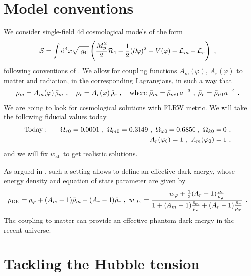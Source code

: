 \documentclass[11pt,a4paper,english,twoside]{article}
\newcommand{\nn}{\nonumber}
\def\beq{\begin{equation}}
\def\eeq{\end{equation}}
\def\bea{\begin{eqnarray}}
\def\eea{\end{eqnarray}}
\def\del {\partial}
\def\d {{\rm d}}
\begin{document}




\section{Model conventions}

We consider single-field 4d cosmological models of the form
\beq
{\cal S} = \int \d^4 x \sqrt{|g_4|} \left( \frac{M_p^2}{2} {\cal R}_4 - \frac12 (\del \varphi)^2 - V(\varphi) - {\cal L}_m - {\cal L}_r \right) \ ,
\eeq
following conventions of \cite[Sec. 3.2]{Andriot:2026lac}. We allow for coupling functions $A_m(\varphi),\, A_r(\varphi)$ to matter and radiation, in the corresponding Lagrangians, in such a way that
\beq
\rho_m = A_m(\varphi) \, \bar{\rho}_m \ ,\quad \rho_r = A_r(\varphi) \, \bar{\rho}_r \ , \quad {\rm where} \ \bar{\rho}_m = \bar{\rho}_{m0} \, a^{-3} \ ,\ \bar{\rho}_r = \bar{\rho}_{r0} \, a^{-4}\ . 
\eeq
We are going to look for cosmological solutions with FLRW metric. We will take the following fiducial values today
\bea
{\rm Today}:&& \quad \Omega_{r0} = 0.0001 \ ,\ \Omega_{m0}= 0.3149 \ ,\ \Omega_{\varphi0}=0.6850 \ ,\ \Omega_{k0}=0 \ ,\\
&& \quad A_r(\varphi_0)=1 \ ,\ A_m(\varphi_0)=1 \ ,\nn
\eea
and we will fix $w_{\varphi0}$ to get realistic solutions.

As argued in \cite{Andriot:2025los}, such a setting allows to define an effective dark energy, whose energy density and equation of state parameter are given by
\beq
\rho_{{\rm DE}} = \rho_{\varphi} + (A_m - 1) \bar{\rho}_m + (A_r - 1) \bar{\rho}_r \ ,\ w_{{\rm DE}} = \frac{w_{\varphi} + \frac13 (A_r -1) \frac{\bar{\rho}_r}{\rho_\varphi}}{1 + (A_m-1) \frac{\bar{\rho}_m}{\rho_\varphi} + (A_r-1) \frac{\bar{\rho}_r}{\rho_\varphi}  } \ .
\eeq
The coupling to matter can provide an effective phantom dark energy in the recent universe.

\section{Tackling the Hubble tension}
\end{document}
